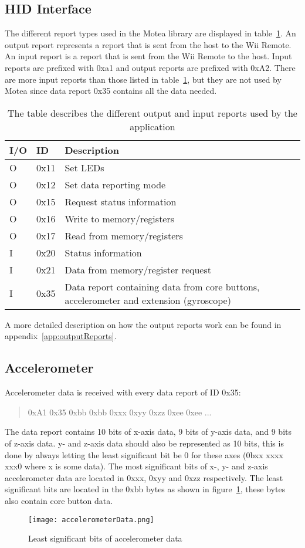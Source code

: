 \subsection{HID Interface}
The different report types used in the Motea library are displayed in table~\ref{tab:hidInterface}. An output report represents a report that is sent from the host to the Wii Remote. An input report is a report that is sent from the Wii Remote to the host. Input reports are prefixed with 0xa1 and output reports are prefixed with 0xA2. There are more input reports than those listed in table~\ref{tab:hidInterface}, but they are not used by Motea since data report 0x35 contains all the data needed. 

\begin{table}[h!]
\centering
\begin{tabularx}{\textwidth}{|l|l|X|}
\hline
I/O & ID & Description \\ \hline
O & 0x11 & Set LEDs \\ \hline
O & 0x12 & Set data reporting mode \\ \hline
O & 0x15 & Request status information \\ \hline
O & 0x16 & Write to memory/registers \\ \hline
O & 0x17 & Read from memory/registers \\ \hline
I & 0x20 & Status information \\ \hline
I & 0x21 & Data from memory/register request \\ \hline
I & 0x35 & Data report containing data from core buttons, accelerometer and extension (gyroscope) \\ \hline
\end{tabularx}
\caption{\footnotesize The table describes the different output and input reports used by the application}
\label{tab:hidInterface}
\end{table}

A more detailed description on how the output reports work can be found in appendix~\ref{app:outputReports}.

\subsection{Accelerometer}
Accelerometer data is received with every data report of ID 0x35:
\begin{quote}
0xA1 0x35 0xbb 0xbb 0xxx 0xyy 0xzz 0xee 0xee ...
\end{quote}
The data report contains 10 bits of x-axis data, 9 bits of y-axis data, and 9 bits of z-axis data. y- and z-axis data should also be represented as 10 bits, this is done by always letting the least significant bit be 0 for these axes (0bxx xxxx xxx0 where x is some data). The most significant bits of x-, y- and z-axis accelerometer data are located in 0xxx, 0xyy and 0xzz respectively. The least significant bits are located in the 0xbb bytes as shown in figure~\ref{fig:accelerometerData}, these bytes also contain core button data.
\begin{figure}[h!]
\texttt{[image: accelerometerData.png]}
\caption{\footnotesize Least significant bits of accelerometer data}
\label{fig:accelerometerData}
\end{figure}

